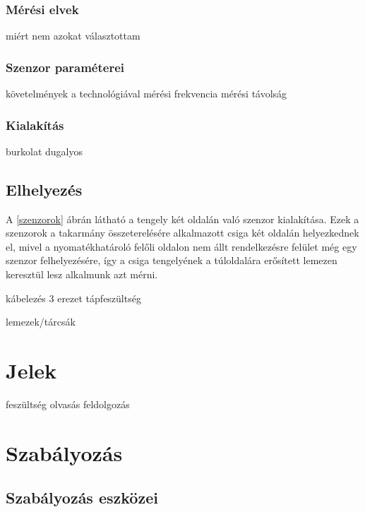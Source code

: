 \subsubsection{Mérési elvek}
miért nem azokat választottam

\subsubsection{Szenzor paraméterei}
követelmények a technológiával
mérési frekvencia
mérési távolság
\subsubsection{Kialakítás}
burkolat
dugalyos
\subsection{Elhelyezés}
A \ref{szenzorok} ábrán látható a tengely két oldalán való szenzor kialakítása. Ezek a szenzorok a takarmány összeterelésére alkalmazott csiga két oldalán helyezkednek el, mivel a nyomatékhatároló felőli oldalon nem állt rendelkezésre felület még egy szenzor felhelyezésére, így a csiga tengelyének a túloldalára erősített lemezen keresztül lesz alkalmunk azt mérni.

kábelezés
3 erezet
tápfeszültség

lemezek/tárcsák
\section{Jelek}
feszültség
olvasás
feldolgozás

\section{Szabályozás}

\subsection{Szabályozás eszközei}

